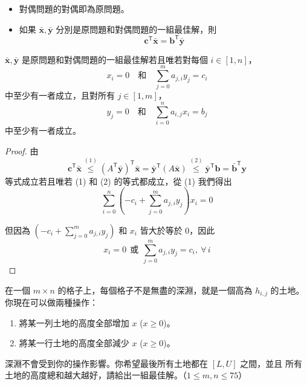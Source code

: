 \documentclass[standalone]{beamer}
\begin{document}
\begin{frame}{}
  \begin{theorem}
    \begin{itemize}
    \item 對偶問題的對偶即為原問題。
    \item 如果 $\bar{\bm{x}}, \bar{\bm{y}}$ 分別是原問題和對偶問題的一組最佳解，則
      \[ \bm{c}^\mathsf{T} \bar{\bm{x}} = \bm{b}^\mathsf{T} \bar{\bm{y}} \]
    \end{itemize}
  \end{theorem}
\end{frame}

\begin{frame}{}
  \begin{theorem}
    $\bar{\bm{x}}, \bar{\bm{y}}$ 是原問題和對偶問題的一組最佳解若且唯若對每個 $i \in [1, n]$，
      \[
        x_i = 0 \quad \text{和} \quad \sum_{j=0}^m a_{j, i} y_j = c_i \label{eq:linear-programming-dual-slackness-1}
      \]
      中至少有一者成立，且對所有 $j \in [1, m]$，
      \[
        y_j = 0 \quad \text{和} \quad \sum_{i=0}^n a_{i, j} x_i = b_j \label{eq:linear-programming-dual-slackness-2}
      \]
      中至少有一者成立。
  \end{theorem}
\end{frame}

\begin{frame}{}
  \begin{proof}
    由
    \[
      \bm{c}^\mathsf{T} \bar{\bm{x}}
      \stackrel{(1)}{\leq} (A^\mathsf{T} \bar{\bm{y}})^\mathsf{T} \bar{\bm{x}}
      = \bar{\bm{y}}^\mathsf{T} (A \bar{\bm{x}})
      \stackrel{(2)}{\leq} \bar{\bm{y}}^\mathsf{T} \bm{b} = \bar{\bm{b}}^\mathsf{T} \bm{y}
    \]
    \pause
    等式成立若且唯若 (1) 和 (2) 的等式都成立，從 (1) 我們得出
    \[ \sum_{i = 0}^n \left( -c_i + \sum_{j = 0}^m a_{j, i} y_j \right) x_i = 0 \]
    \pause

    但因為 $\left( -c_i + \sum_{j = 0}^m a_{j, i} y_j \right)$ 和 $x_i$ 皆大於等於 $0$，因此
    \[ x_i = 0 \ \ \text{或}\ \ \sum_{j = 0}^m a_{j, i} y_j = c_i, \ \forall \, i \]
  \end{proof}
\end{frame}

\begin{frame}{}
  \begin{problem}
  在一個 $m \times n$ 的格子上，每個格子不是無盡的深淵，就是一個高為 $h_{i, j}$ 的土地。
  你現在可以做兩種操作：

  \begin{enumerate}
    \item 將某一列土地的高度全部增加 $x$ ($x \geq 0$)。
    \item 將某一行土地的高度全部減少 $x$ ($x \geq 0$)。
  \end{enumerate}

  深淵不會受到你的操作影響。你希望最後所有土地都在 $[L, U]$ 之間，並且
  所有土地的高度總和越大越好，請給出一組最佳解。（$1 \leq m, n \leq 75$）
  \end{problem}
\end{frame}
\end{document}
